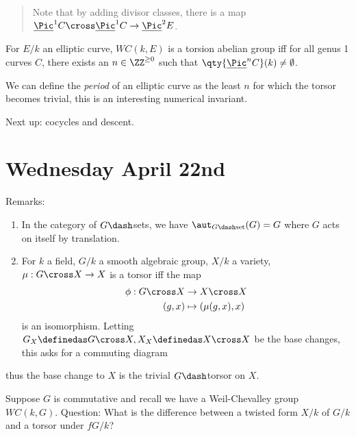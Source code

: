 \begin{quote}
Note that by adding divisor classes, there is a map
\(\underline{\Pic}^1 C \cross \underline{\Pic}^1 C \to \underline{\Pic}^2 E\).
\end{quote}

\begin{description}
\tightlist
\item[Corollary]
For \(E/k\) an elliptic curve, \(WC(k, E)\) is a torsion abelian group
iff for all genus 1 curves \(C\), there exists an \(n\in \ZZ^{\geq 0}\)
such that \(\qty{\underline{\Pic}^n C}(k) \neq \emptyset\).
\end{description}

We can define the \emph{period} of an elliptic curve as the least \(n\)
for which the torsor becomes trivial, this is an interesting numerical
invariant.

Next up: cocycles and descent.

\hypertarget{wednesday-april-22nd}{%
\section{Wednesday April 22nd}\label{wednesday-april-22nd}}

Remarks:

\begin{enumerate}
\def\labelenumi{\arabic{enumi}.}
\item
  In the category of \(G\dash\)sets, we have
  \(\aut_{G\dash\text{set}}(G) = G\) where \(G\) acts on itself by
  translation.
\item
  For \(k\) a field, \(G/k\) a smooth algebraic group, \(X/k\) a
  variety, \(\mu: G\cross X \to X\) is a torsor iff the map
  \begin{align*}
    \phi: G \cross X &\to X\cross X \\
    (g, x) &\mapsto (\mu(g, x), x)
    \end{align*} is an isomorphism. Letting
  \(G_X \definedas G\cross X, X_X \definedas X\cross X\) be the base
  changes, this asks for a commuting diagram
\end{enumerate}

\begin{center}\end{center}

thus the base change to \(X\) is the trivial \(G\dash\)torsor on \(X\).

Suppose \(G\) is commutative and recall we have a Weil-Chevalley group
\(WC(k, G)\). Question: What is the difference between a twisted form
\(X/k\) of \(G/k\) and a torsor under \(fG/k\)?

